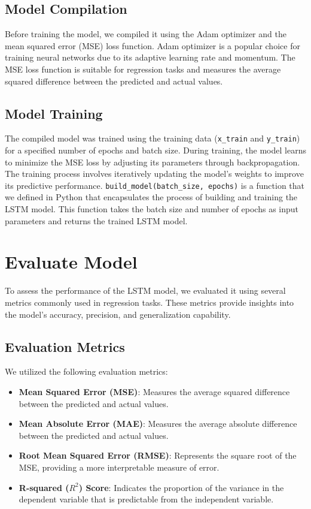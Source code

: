 \documentclass[10pt,twocolumn,letterpaper]{article}
\begin{document}
\subsection{Model Compilation}
Before training the model, we compiled it using the Adam optimizer and the mean 
squared error (MSE) loss function. Adam optimizer is a popular choice for training 
neural networks due to its adaptive learning rate and momentum. The MSE loss 
function is suitable for regression tasks and measures the average squared difference 
between the predicted and actual values.

\subsection{Model Training}
The compiled model was trained using the training data (\texttt{x\_train} 
and \texttt{y\_train}) for a specified number of epochs and batch size. 
During training, the model learns to minimize the MSE loss by adjusting 
its parameters through backpropagation. The training process involves 
iteratively updating the model's weights to improve its predictive performance.
\texttt{build\_model(batch\_size, epochs)} is a function that we defined in Python
that encapsulates the process of building and training the LSTM model.
This function takes the batch size and number of epochs as input parameters 
and returns the trained LSTM model.



\section{Evaluate Model}
\label{sec:evaluate-model}
To assess the performance of the LSTM model, we evaluated it using 
several metrics commonly used in regression tasks. These metrics provide 
insights into the model's accuracy, precision, and generalization capability.

\subsection{Evaluation Metrics}
We utilized the following evaluation metrics:
\begin{itemize}
    \item \textbf{Mean Squared Error (MSE)}: Measures the average squared difference between the predicted and actual values.
    \item \textbf{Mean Absolute Error (MAE)}: Measures the average absolute difference between the predicted and actual values.
    \item \textbf{Root Mean Squared Error (RMSE)}: Represents the square root of the MSE, providing a more interpretable measure of error.
    \item \textbf{R-squared ($R^2$) Score}: Indicates the proportion of the variance in the dependent variable that is predictable from the independent variable.
\end{itemize}
\end{document}
